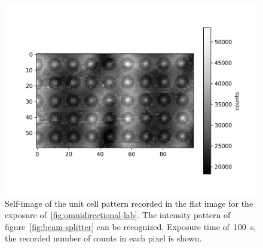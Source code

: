 \begin{figure}[htb]
    \centering
    \includegraphics[width=\textwidth]{gfx/omnidirectional/visibility-omnidirectional.png}
    \caption{Self-image of the unit cell pattern recorded in the flat image
        for the exposure of~\ref{fig:omnidirectional-lab}. The intensity
        pattern of figure~\ref{fig:beam-splitter} can be recognized.
        Exposure time of~\SI{100}{\second}, the recorded number of counts in
    each pixel is shown.}
    \label{fig:cells}
\end{figure}
